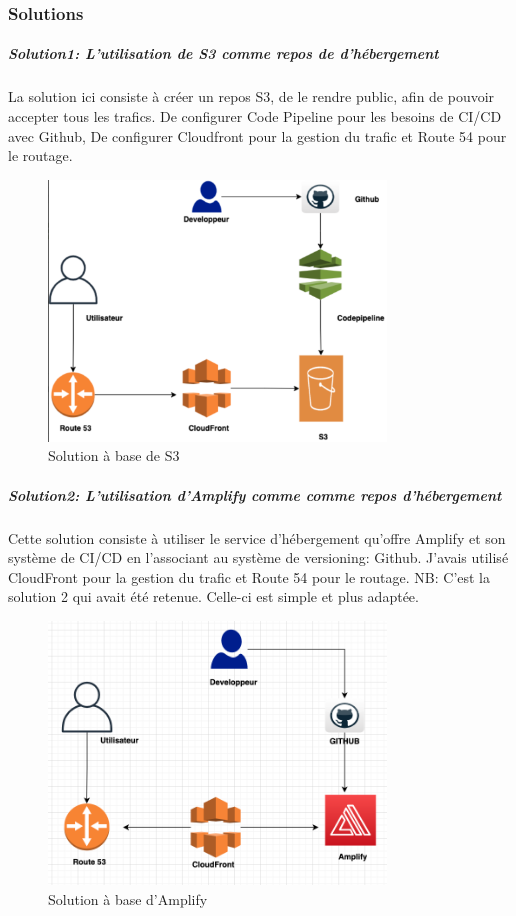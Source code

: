\subsubsection{Solutions}
\subparagraph{Solution1: L’utilisation de S3 comme repos de d'hébergement}
La solution ici consiste à créer un repos S3, de le rendre public, afin de pouvoir accepter tous les trafics.
De configurer Code Pipeline pour les besoins de CI/CD avec Github, De configurer Cloudfront pour la
gestion du trafic et Route 54 pour le routage.
 \begin{figure}[H]
            \centering
                \includegraphics[width=0.8\textwidth]{Figures/S3}
	       \decoRule
		\caption[Solution à base de S3]{Solution à base de S3}
	\label{fig:S3}
	\end{figure}
\newpage
\subparagraph{Solution2: L’utilisation d’Amplify comme comme repos d'hébergement}
Cette solution consiste à utiliser le service d’hébergement qu’offre Amplify et son système de CI/CD en
l’associant au système de versioning: Github. J'avais utilisé CloudFront pour la gestion du trafic et Route 54
pour le routage.
NB: C’est la solution 2 qui avait été retenue. Celle-ci est simple et plus adaptée.
 \begin{figure}[H]
            \centering
                \includegraphics[width=0.8\textwidth]{Figures/amplify}
	       \decoRule
		\caption[Solution à base d'Amplify]{Solution à base d'Amplify}
	\label{fig:Amplify}
	\end{figure}
	
